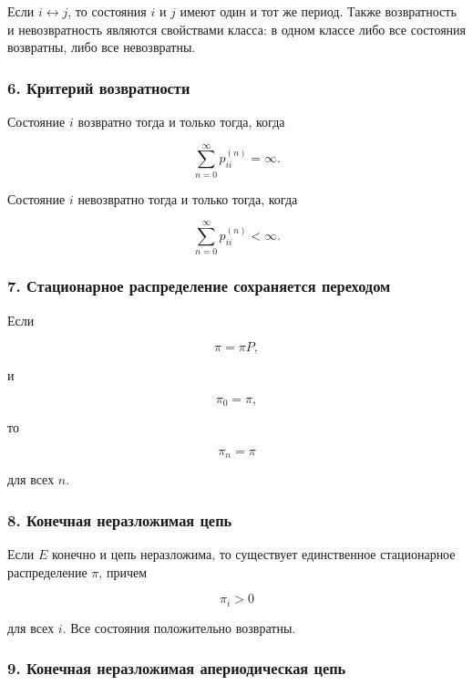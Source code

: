 \documentclass[
  11pt,
  a4paper,
]{article}
\begin{document}
Если \(i\leftrightarrow j\), то состояния \(i\) и \(j\) имеют один и тот
же период. Также возвратность и невозвратность являются свойствами
класса: в одном классе либо все состояния возвратны, либо все
невозвратны.

\subsubsection{6. Критерий
возвратности}\label{ux43aux440ux438ux442ux435ux440ux438ux439-ux432ux43eux437ux432ux440ux430ux442ux43dux43eux441ux442ux438}

Состояние \(i\) возвратно тогда и только тогда, когда

\[
\sum_{n=0}^{\infty}p_{ii}^{(n)}=\infty.
\]

Состояние \(i\) невозвратно тогда и только тогда, когда

\[
\sum_{n=0}^{\infty}p_{ii}^{(n)}<\infty.
\]

\subsubsection{7. Стационарное распределение сохраняется
переходом}\label{ux441ux442ux430ux446ux438ux43eux43dux430ux440ux43dux43eux435-ux440ux430ux441ux43fux440ux435ux434ux435ux43bux435ux43dux438ux435-ux441ux43eux445ux440ux430ux43dux44fux435ux442ux441ux44f-ux43fux435ux440ux435ux445ux43eux434ux43eux43c}

Если

\[
\pi=\pi P,
\]

и

\[
\pi_0=\pi,
\]

то

\[
\pi_n=\pi
\]

для всех \(n\).

\subsubsection{8. Конечная неразложимая
цепь}\label{ux43aux43eux43dux435ux447ux43dux430ux44f-ux43dux435ux440ux430ux437ux43bux43eux436ux438ux43cux430ux44f-ux446ux435ux43fux44c}

Если \(E\) конечно и цепь неразложима, то существует единственное
стационарное распределение \(\pi\), причем

\[
\pi_i>0
\]

для всех \(i\). Все состояния положительно возвратны.

\subsubsection{9. Конечная неразложимая апериодическая
цепь}\label{ux43aux43eux43dux435ux447ux43dux430ux44f-ux43dux435ux440ux430ux437ux43bux43eux436ux438ux43cux430ux44f-ux430ux43fux435ux440ux438ux43eux434ux438ux447ux435ux441ux43aux430ux44f-ux446ux435ux43fux44c}
\end{document}
